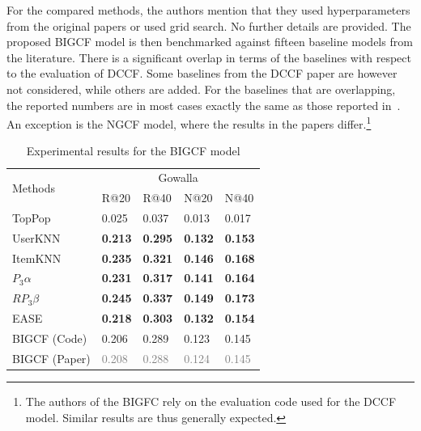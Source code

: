 \documentclass[sigconf,natbib=true,nonacm]{acmart}
\begin{document}
For the compared methods, the authors mention that they used hyperparameters from the original papers or used grid search. No further details are provided.  The proposed BIGCF model is then benchmarked against fifteen baseline models from the literature. There is a significant overlap in terms of the baselines with respect to the evaluation of DCCF. Some baselines from the DCCF paper are however not considered, while others are added. For the baselines that are overlapping, the reported numbers are in most cases exactly the same as those reported in~\cite{ren2023disentangled}. An exception is the NGCF model, where the results in the papers differ.\footnote{The authors of the BIGFC rely on the evaluation code used for the DCCF model. Similar results are thus generally expected.}

\begin{table}[ht!]
    \caption{Experimental results for the BIGCF model}
    \label{tab:bigcf}
    \centering
    \begin{tabular}{l l l l l }
        \multirow{2}{*}{Methods} & \multicolumn{4}{c}{Gowalla} \\
        ~                        & R@20                 & R@40                      & N@20                  & N@40       \\ \hline
        TopPop               & 0.025                & 0.037                     & 0.013                 & 0.017          \\
        UserKNN                  & \textbf{0.213}       & \textbf{0.295}            & \textbf{0.132}        & \textbf{0.153} \\
        ItemKNN                  & \textbf{0.235}       & \textbf{0.321}            & \textbf{0.146}        & \textbf{0.168} \\
        $P_{3}\alpha$            & \textbf{0.231}       & \textbf{0.317}            & \textbf{0.141}        & \textbf{0.164}   \\
        $RP_{3}\beta$            &  \textbf{0.245}      &  \textbf{0.337}           & \textbf{0.149}        & \textbf{0.173}     \\
        EASE                     &  \textbf{0.218}      &  \textbf{0.303}           & \textbf{0.132}        & \textbf{0.154}    \\ \hline
        BIGCF  (Code)                  & 0.206	            & 0.289	                    &   0.123	            &  0.145           \\
        BIGCF (Paper)            & \textcolor{gray}{0.208}               & \textcolor{gray}{0.288}                    & \textcolor{gray}{0.124} & \textcolor{gray}{0.145}   \\ %


\end{tabular}
\end{table}
\end{document}
